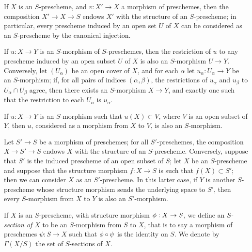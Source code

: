 \begin{env}[2.5.3]
\label{I.2.5.3}
If $X$ is an $S$-prescheme, and $v:X'\to X$ a morphism of preschemes, then the composition $X'\to X\to S$ endows $X'$ with the structure of an $S$-prescheme;
in particular, every prescheme induced by an open set $U$ of $X$ can be considered as an $S$-prescheme by the canonical injection.

If $u:X\to Y$ is an $S$-morphism of $S$-preschemes, then the restriction of $u$ to any prescheme induced by an open subset $U$ of $X$ is also an $S$-morphism $U\to Y$.
Conversely, let $(U_\alpha)$ be an open cover of $X$, and for each $\alpha$ let $u_\alpha:U_\alpha\to Y$ be an $S$-morphism;
if, for all pairs of indices $(\alpha,\beta)$, the restrictions of $u_\alpha$ and $u_\beta$ to $U_\alpha\cap U_\beta$ agree, then there exists an $S$-morphism $X\to Y$, and exactly one such that the restriction to each $U_\alpha$ is $u_\alpha$.

If $u:X\to Y$ is an $S$-morphism such that $u(X)\subset V$, where $V$ is an open subset of $Y$, then $u$, considered as a morphism from $X$ to $V$, is also an $S$-morphism.
\end{env}

\begin{env}[2.5.4]
\label{I.2.5.4}
Let $S'\to S$ be a morphism of preschemes;
for all $S'$-preschemes, the composition $X\to S'\to S$ endows $X$ with the structure of an $S$-prescheme.
Conversely, suppose that $S'$ is the induced prescheme of an open subset of $S$;
let $X$ be an $S$-prescheme and suppose that the structure morphism $f:X\to S$ is such that $f(X)\subset S'$;
then we can consider $X$ as an $S'$-prescheme.
In this latter case, if $Y$ is another $S$-prescheme whose structure morphism sends the underlying space to $S'$, then every $S$-morphism from $X$ to $Y$ is also an $S'$-morphism.
\end{env}

\begin{env}[2.5.5]
\label{I.2.5.5}
If $X$ is an $S$-prescheme, with structure morphism $\vphi:X\to S$, we define an \emph{$S$-section of $X$} to be an $S$-morphism from $S$ to $X$, that is to say a morphism of preschemes $\psi:S\to X$ such that $\phi\circ\psi$ is the identity on $S$.
We denote by $\Gamma(X/S)$ the set of $S$-sections of $X$.
\end{env}

